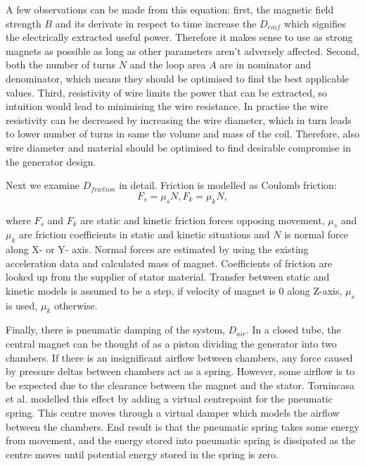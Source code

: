 A few observations can be made from this equation: first, the magnetic field strength $B$ and its derivate in respect to time increase the $D_{emf}$ which signifies the electrically extracted useful power. Therefore it makes sense to use as strong magnets as possible as long as other parameters aren't adversely affected. Second, both the number of turns $N$ and the loop area $A$ are in nominator and denominator, which means they should be optimised to find the best applicable values. Third, resistivity of wire limits the power that can be extracted, so intuition would lead to minimising the wire resistance. In practise the wire resistivity can be decreased by increasing the wire diameter, which in turn leads to lower number of turns in same the volume and mass of the coil. Therefore, also wire diameter and material should be optimised to find desirable compromise in the generator design. 

Next we examine $D_{friction}$ in detail. Friction is modelled as Coulomb friction:
\begin{equation}\label{eq:Coulomb_friction}
  F_s = \mu_sN,
  F_k = \mu_kN,
\end{equation}

where $F_s $ and $ F_k $ are static and kinetic friction forces opposing movement, $\mu_s$ and $\mu_k$ are friction coefficients in static and kinetic situations and $N$ is normal force along X- or Y- axis. Normal forces are estimated by using the existing acceleration data and calculated mass of magnet. Coefficients of friction are looked up from the supplier of stator material. Transfer between static and kinetic models is assumed to be a step, if velocity of magnet is 0 along Z-axis, $\mu_s$ is used, $\mu_k$ otherwise.

Finally, there is pneumatic damping of the system, $D_{air}$. In a closed tube, the central magnet can be thought of as a piston dividing the generator into two chambers. If there is an insignificant airflow between chambers, any force caused by pressure deltas between chambers act as a spring. However, some airflow is to be expected due to the clearance between the magnet and the stator. Tornincasa et al. \cite{Tornincasa2012} modelled this effect by adding a virtual centrepoint for the pneumatic spring. This centre moves through a virtual damper which models the airflow between the chambers. End result is that the pneumatic spring takes some energy from movement, and the energy stored into pneumatic spring is dissipated as the centre moves until potential energy stored in the spring is zero. 

